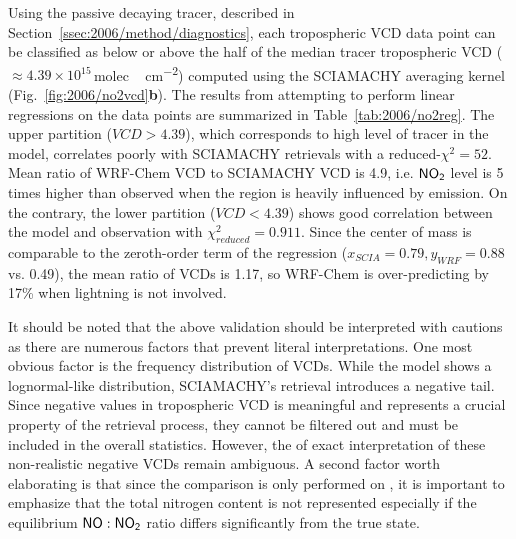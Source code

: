 Using the passive decaying {\lnox} tracer, described in Section~\ref{ssec:2006/method/diagnostics}, each tropospheric VCD data point can be classified as below or above the half of the median {\lnox} tracer
tropospheric VCD ($\approx4.39\times10^{15}$\,\unit{molec.\,cm^{-2}}) computed using the SCIAMACHY averaging kernel (Fig.~\ref{fig:2006/no2vcd}{\bf b}). The results from attempting to perform linear
regressions on the data points are summarized in Table~\ref{tab:2006/no2reg}. The upper partition ($VCD>4.39$), which corresponds to high level of {\lnox} tracer in the model, correlates poorly with
SCIAMACHY retrievals with a reduced-$\chi^2=52$. Mean ratio of WRF-Chem VCD to SCIAMACHY VCD is 4.9, i.e. $\chem{NO_2}$ level is 5 times higher than observed when the region is heavily influenced
by {\lnox} emission. On the contrary, the lower partition ($VCD<4.39$) shows good correlation between the model and observation with $\chi_{reduced}^2=0.911$. Since the center of mass is comparable to
the zeroth-order term of the regression ($x_{SCIA}=0.79,y_{WRF}=0.88$ vs. 0.49), the mean ratio of VCDs is 1.17, so WRF-Chem is over-predicting by 17\% when lightning is not involved.

It should be noted that the above validation should be interpreted with cautions as there are numerous factors that prevent literal interpretations. One most obvious factor is the frequency distribution of VCDs.
While the model shows a lognormal-like distribution, SCIAMACHY's retrieval introduces a negative tail. Since negative values in tropospheric VCD is meaningful and represents a crucial property of the retrieval
process, they cannot be filtered out and must be included in the overall statistics. However, the of exact interpretation of these non-realistic negative VCDs remain ambiguous. A second factor worth elaborating is
that since the comparison is only performed on , it is important to emphasize that the total nitrogen content is not represented especially if the equilibrium $\chem{NO}:\chem{NO_2}$ ratio differs
significantly from the true state.


